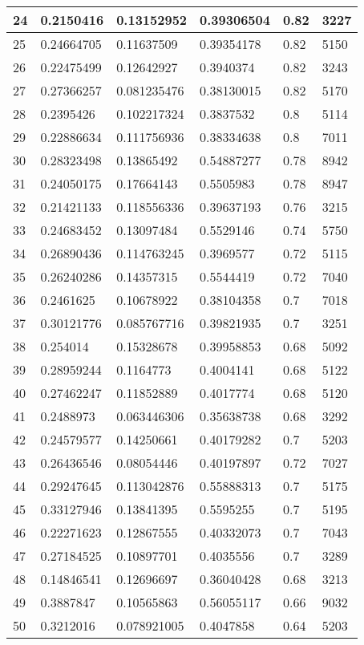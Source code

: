 \begin{longtable}{|l|l|l|l|l|l|}
24 & 0.2150416 & 0.13152952 & 0.39306504 & 0.82 & 3227 \\ \hline 
25 & 0.24664705 & 0.11637509 & 0.39354178 & 0.82 & 5150 \\ \hline 
26 & 0.22475499 & 0.12642927 & 0.3940374 & 0.82 & 3243 \\ \hline 
27 & 0.27366257 & 0.081235476 & 0.38130015 & 0.82 & 5170 \\ \hline 
28 & 0.2395426 & 0.102217324 & 0.3837532 & 0.8 & 5114 \\ \hline 
29 & 0.22886634 & 0.111756936 & 0.38334638 & 0.8 & 7011 \\ \hline 
30 & 0.28323498 & 0.13865492 & 0.54887277 & 0.78 & 8942 \\ \hline 
31 & 0.24050175 & 0.17664143 & 0.5505983 & 0.78 & 8947 \\ \hline 
32 & 0.21421133 & 0.118556336 & 0.39637193 & 0.76 & 3215 \\ \hline 
33 & 0.24683452 & 0.13097484 & 0.5529146 & 0.74 & 5750 \\ \hline 
34 & 0.26890436 & 0.114763245 & 0.3969577 & 0.72 & 5115 \\ \hline 
35 & 0.26240286 & 0.14357315 & 0.5544419 & 0.72 & 7040 \\ \hline 
36 & 0.2461625 & 0.10678922 & 0.38104358 & 0.7 & 7018 \\ \hline 
37 & 0.30121776 & 0.085767716 & 0.39821935 & 0.7 & 3251 \\ \hline 
38 & 0.254014 & 0.15328678 & 0.39958853 & 0.68 & 5092 \\ \hline 
39 & 0.28959244 & 0.1164773 & 0.4004141 & 0.68 & 5122 \\ \hline 
40 & 0.27462247 & 0.11852889 & 0.4017774 & 0.68 & 5120 \\ \hline 
41 & 0.2488973 & 0.063446306 & 0.35638738 & 0.68 & 3292 \\ \hline 
42 & 0.24579577 & 0.14250661 & 0.40179282 & 0.7 & 5203 \\ \hline 
43 & 0.26436546 & 0.08054446 & 0.40197897 & 0.72 & 7027 \\ \hline 
44 & 0.29247645 & 0.113042876 & 0.55888313 & 0.7 & 5175 \\ \hline 
45 & 0.33127946 & 0.13841395 & 0.5595255 & 0.7 & 5195 \\ \hline 
46 & 0.22271623 & 0.12867555 & 0.40332073 & 0.7 & 7043 \\ \hline 
47 & 0.27184525 & 0.10897701 & 0.4035556 & 0.7 & 3289 \\ \hline 
48 & 0.14846541 & 0.12696697 & 0.36040428 & 0.68 & 3213 \\ \hline 
49 & 0.3887847 & 0.10565863 & 0.56055117 & 0.66 & 9032 \\ \hline 
50 & 0.3212016 & 0.078921005 & 0.4047858 & 0.64 & 5203 \\ \hline 
\end{longtable}
